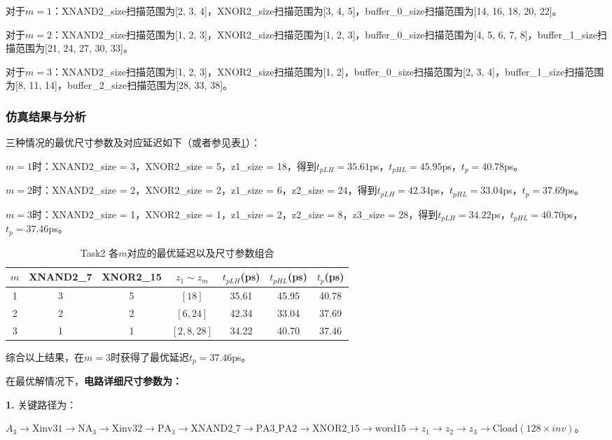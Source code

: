 \documentclass[UTF8,12pt,a4paper]{ctexart}
\begin{document}
对于$m = 1$：XNAND2\_size扫描范围为[2, 3, 4]，XNOR2\_size扫描范围为[3, 4, 5]，buffer\_0\_size扫描范围为[14, 16, 18, 20, 22]。

对于$m = 2$：XNAND2\_size扫描范围为[1, 2, 3]，XNOR2\_size扫描范围为[1, 2, 3]，buffer\_0\_size扫描范围为[4, 5, 6, 7, 8]，buffer\_1\_size扫描范围为[21, 24, 27, 30, 33]。

对于$m = 3$：XNAND2\_size扫描范围为[1, 2, 3]，XNOR2\_size扫描范围为[1, 2]，buffer\_0\_size扫描范围为[2, 3, 4]，buffer\_1\_size扫描范围为[8, 11, 14]，buffer\_2\_size扫描范围为[28, 33, 38]。

\subsubsection{仿真结果与分析}

三种情况的最优尺寸参数及对应延迟如下（或者参见表\ref{tab:task2_parc_best_tp}）：

$m = 1$时：XNAND2\_size = 3，XNOR2\_size = 5，z1\_size = 18，得到$t_{pLH} = 35.61$ps，$t_{pHL} = 45.95$ps，$t_p = 40.78$ps。

$m = 2$时：XNAND2\_size = 2，XNOR2\_size = 2，z1\_size = 6，z2\_size = 24，得到$t_{pLH} = 42.34$ps，$t_{pHL} = 33.04$ps，$t_p = 37.69$ps。

$m = 3$时：XNAND2\_size = 1，XNOR2\_size = 1，z1\_size = 2，z2\_size = 8，z3\_size = 28，得到$t_{pLH} = 34.22$ps，$t_{pHL} = 40.70$ps，$t_p = 37.46$ps。

\begin{table}[htbp]
\centering
\caption{Task2 各$m$对应的最优延迟以及尺寸参数组合}
\label{tab:task2_parc_best_tp}
\begin{tabular}{ccccccc}
\toprule
$m$ & XNAND2\_7 & XNOR2\_15 & $z_1 \sim z_m$ &$t_{pLH}$(ps) & $t_{pHL}$(ps) & $t_p$(ps) \\
\midrule
1 & 3 & 5 & $[18]$ & 35.61 & 45.95 & 40.78 \\
2 & 2 & 2 & $[6, 24]$ & 42.34 & 33.04 & 37.69 \\
3 & 1 & 1 & $[2, 8, 28]$ & 34.22 & 40.70 & 37.46 \\
\bottomrule
\end{tabular}
\end{table}

综合以上结果，在$m = 3$时获得了最优延迟$t_p = 37.46$ps。

在最优解情况下，\textbf{电路详细尺寸参数为：}

\textbf{1.} 关键路径为：

$A_3 \rightarrow \text{Xinv31} \rightarrow \text{NA}_3 \rightarrow \text{Xinv32} \rightarrow \text{PA}_3 \rightarrow \text{XNAND2\_7} \rightarrow \text{PA3\_PA2} \rightarrow \text{XNOR2\_15} \rightarrow \text{word}15 \rightarrow z_1 \rightarrow z_2 \rightarrow z_3 \rightarrow \text{Cload}(128\times{inv})$。
\end{document}
